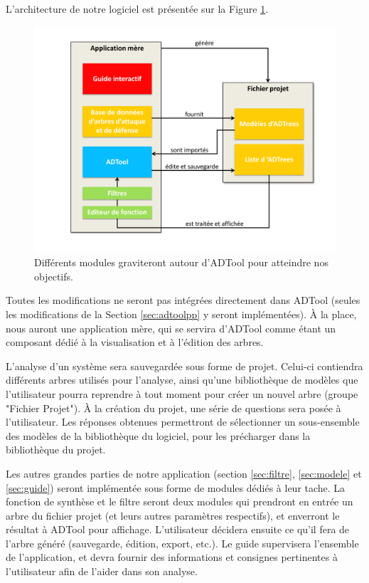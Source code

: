         L'architecture de notre logiciel est présentée sur la Figure \ref{fig:archi}.   

        \begin{figure}
            \begin{center}
                \includegraphics[width=1\textwidth]{figure/archi.pdf}
            \end{center}
            \caption{Différents modules graviteront autour d'ADTool pour atteindre nos objectifs.}
            \label{fig:archi}
        \end{figure}

        Toutes les modifications ne seront pas intégrées directement dans ADTool (seules les modifications de la Section \ref{sec:adtoolpp} y seront implémentées). \`A la place, nous auront une application mère, qui se servira d'ADTool comme étant un composant dédié à la visualisation et à l'édition des arbres. 

        L'analyse d'un système sera sauvegardée sous forme de projet. Celui-ci contiendra différents arbres utilisés pour l'analyse, ainsi qu'une bibliothèque de modèles que l'utilisateur pourra reprendre à tout moment pour créer un nouvel arbre (groupe "Fichier Projet"). 
        \`A la création du projet, une série de questions sera posée à l'utilisateur. Les réponses obtenues permettront de sélectionner un sous-ensemble des modèles de la bibliothèque du logiciel, pour les précharger dans la bibliothèque du projet.

        Les autres grandes parties de notre application (section \ref{sec:filtre}, \ref{sec:modele} et \ref{sec:guide}) seront implémentée sous forme de modules dédiés à leur tache.
        La fonction de synthèse et le filtre seront deux modules qui prendront en entrée un arbre du fichier projet (et leurs autres paramètres respectifs), et enverront le résultat à ADTool pour affichage. L'utilisateur décidera ensuite ce qu'il fera de l'arbre généré (sauvegarde, édition, export, etc.).
        Le guide supervisera l'ensemble de l'application, et devra fournir des informations et consignes pertinentes à l'utilisateur afin de l'aider dans son analyse.

